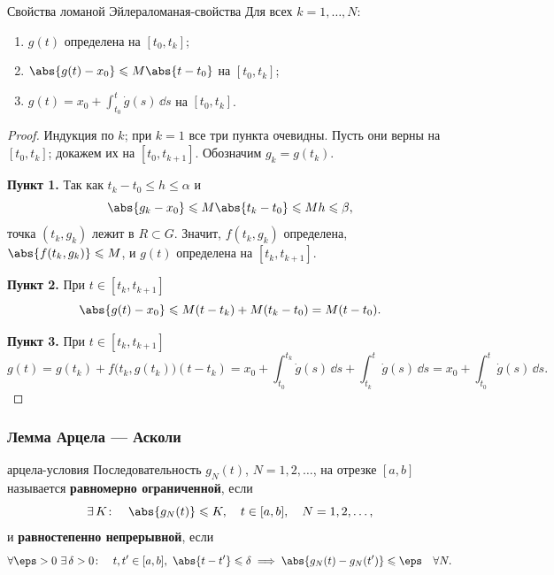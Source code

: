 \begin{Lemma}{Свойства ломаной Эйлера}{ломаная-свойства}
	Для всех $k = 1, \dots, N$:
	\begin{enumerate}
		\item $g(t)$ определена на $[t_0, t_k]$;
		\item $\abs{g(t) - x_0} \leqslant M\abs{t - t_0}$ на $[t_0, t_k]$;
		\item $g(t) = x_0 + \displaystyle\int_{t_0}^{t} \dot g(s)\,\dd s$
		на $[t_0, t_k]$.
	\end{enumerate}
\end{Lemma}

\begin{proof}
	Индукция по $k$; при $k = 1$ все три пункта очевидны. Пусть они верны
	на $[t_0, t_k]$; докажем их на $[t_0, t_{k+1}]$. Обозначим
	$g_k = g(t_k)$.

	\medskip
	\textbf{Пункт 1.} Так как $t_k - t_0 \leqslant h \leqslant \alpha$ и
	\[
	\abs{g_k - x_0} \leqslant M\abs{t_k - t_0} \leqslant Mh \leqslant \beta,
	\]
	точка $(t_k, g_k)$ лежит в $R \subset G$. Значит, $f(t_k, g_k)$
	определена, $\abs{f(t_k,g_k)} \leqslant M$, и $g(t)$ определена на
	$[t_k, t_{k+1}]$.

	\medskip
	\textbf{Пункт 2.} При $t \in [t_k, t_{k+1}]$
	\[
	\abs{g(t) - x_0} \leqslant M(t - t_k) + M(t_k - t_0) = M(t - t_0).
	\]

	\medskip
	\textbf{Пункт 3.} При $t \in [t_k, t_{k+1}]$
	\[
	g(t) = g(t_k) + f\bigl(t_k, g(t_k)\bigr)(t - t_k)
	= x_0 + \int_{t_0}^{t_k} \dot g(s)\,\dd s + \int_{t_k}^{t} \dot g(s)\,\dd s
	= x_0 + \int_{t_0}^{t} \dot g(s)\,\dd s.
	\]
\end{proof}

\subsubsection*{Лемма Арцела --- Асколи}

\begin{Definition}{}{арцела-условия}
	Последовательность $g_N(t)$, $N = 1, 2, \dots$, на отрезке $[a,b]$
	называется \textbf{равномерно ограниченной}, если
	\[
	\exists\, K \colon \quad \abs{g_N(t)} \leqslant K, \quad t \in [a,b],
	\quad N = 1, 2, \dots,
	\]
	и \textbf{равностепенно непрерывной}, если
	\[
	\forall \eps > 0\ \exists\, \delta > 0 \colon \quad
	t, t' \in [a,b],\ \abs{t - t'} \leqslant \delta
	\implies \abs{g_N(t) - g_N(t')} \leqslant \eps \quad \forall N.
	\]
\end{Definition}

